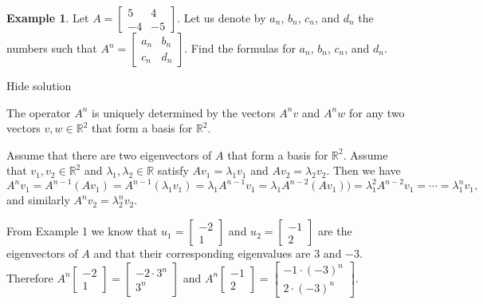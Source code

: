 \documentclass[11pt]{article}
\theoremstyle{definition}
\newtheorem{exmp}[thm]{Example}
\theoremstyle{plain}
\begin{document}
\begin{exmp}
Let \( A=\left[\begin{array}{cc} 5&4\\-4&-5\end{array}\right]\). Let us denote by \( a_n \), \( b_n \), \( c_n \), and \( d_n \) the numbers such that \( A^n=\left[\begin{array}{cc} a_n&b_n\\c_n&d_n\end{array}\right]\). Find the formulas for \( a_n \), \( b_n \), \( c_n \), and \( d_n \).
\end{exmp}

Hide solution

The operator \( A^n \) is uniquely determined by the vectors \( A^nv \) and \( A^nw \) for any two vectors \( v,w\in\mathbb R^2 \) that form a basis for \( \mathbb R^2 \).

Assume that there are two eigenvectors of \( A \) that form a basis for \( \mathbb R^2 \). Assume that \( v_1,v_2\in\mathbb R^2 \) and \( \lambda_1,\lambda_2\in\mathbb R \) satisfy \( Av_1=\lambda_1v_1 \) and \( Av_2=\lambda_2v_2 \). Then we have \[ A^nv_1=A^{n-1}(Av_1)=A^{n-1}(\lambda_1v_1)=\lambda_1A^{n-1}v_1=\lambda_1A^{n-2}(Av_1))=\lambda_1^2A^{n-2}v_1=\cdots=\lambda_1^nv_1,\] and similarly \( A^nv_2=\lambda_2^nv_2 \).

From Example 1 we know that \( u_1=\left[\begin{array}{c}-2\\1\end{array}\right]\) and \( u_2=\left[\begin{array}{c}-1\\2\end{array}\right]\) are the eigenvectors of \( A \) and that their corresponding eigenvalues are \( 3 \) and \( -3 \). Therefore \( A^n\left[\begin{array}{c}-2\\1\end{array}\right]=\left[\begin{array}{c}-2\cdot 3^n\\3^n\end{array}\right]\) and \( A^n\left[\begin{array}{c}-1\\2\end{array}\right]=\left[\begin{array}{c}-1\cdot (-3)^n\\2\cdot (-3)^n\end{array}\right]\).
\end{document}
